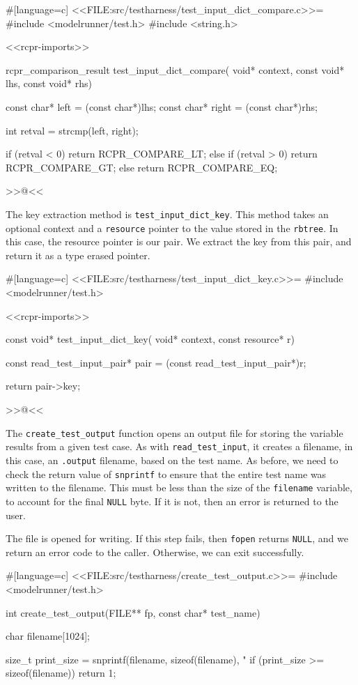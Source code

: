 {#[language=c]
<<FILE:src/testharness/test_input_dict_compare.c>>=
#include <modelrunner/test.h>
#include <string.h>

<<rcpr-imports>>

rcpr_comparison_result test_input_dict_compare(
    void* context, const void* lhs, const void* rhs)
{
    const char* left = (const char*)lhs;
    const char* right = (const char*)rhs;

    int retval = strcmp(left, right);

    if (retval < 0)
        return RCPR_COMPARE_LT;
    else if (retval > 0)
        return RCPR_COMPARE_GT;
    else
        return RCPR_COMPARE_EQ;
}
>>@<<

\newpage

The key extraction method is \verb/test_input_dict_key/. This method takes an
optional context and a \verb/resource/ pointer to the value stored in the
\verb/rbtree/.  In this case, the resource pointer is our pair.  We extract the
key from this pair, and return it as a type erased pointer.

#[language=c]
<<FILE:src/testharness/test_input_dict_key.c>>=
#include <modelrunner/test.h>

<<rcpr-imports>>

const void* test_input_dict_key(
    void* context, const resource* r)
{
    const read_test_input_pair* pair = (const read_test_input_pair*)r;

    return pair->key;
}
>>@<<

The \verb/create_test_output/ function opens an output file for storing the
variable results from a given test case.  As with \verb/read_test_input/, it
creates a filename, in this case, an \verb/.output/ filename, based on the test
name. As before, we need to check the return value of \verb/snprintf/ to ensure
that the entire test name was written to the filename. This must be less than
the size of the \verb/filename/ variable, to account for the final \verb/NULL/
byte. If it is not, then an error is returned to the user.

The file is opened for writing. If this step fails, then \verb/fopen/ returns
\verb/NULL/, and we return an error code to the caller.  Otherwise, we can exit
successfully.

#[language=c]
<<FILE:src/testharness/create_test_output.c>>=
#include <modelrunner/test.h>

int create_test_output(FILE** fp, const char* test_name)
{
    char filename[1024];

    size_t print_size =
        snprintf(filename, sizeof(filename), "%
    if (print_size >= sizeof(filename))
    {
        return 1;
    }

}}
